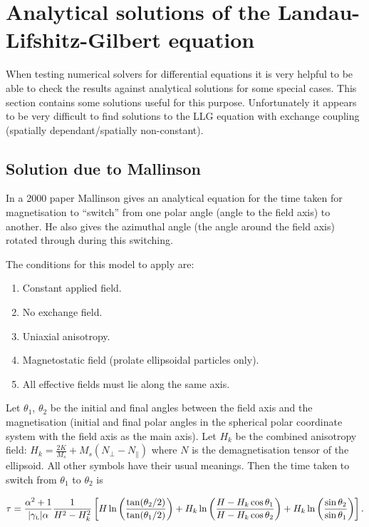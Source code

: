 \section{Analytical solutions of the Landau-Lifshitz-Gilbert equation}

When testing numerical solvers for differential equations it is very
helpful to be able to check the results against analytical solutions for
some special cases. This section contains some solutions useful for this
purpose.
Unfortunately it appears to be very difficult to find solutions to the LLG equation with exchange coupling (\ie spatially dependant/spatially non-constant).

\subsection{Solution due to Mallinson}

In a 2000 paper\cite{Mallinson2000} Mallinson gives an analytical equation for the time taken for magnetisation to ``switch'' from one polar angle (angle to the field axis) to another.
He also gives the azimuthal angle (the angle around the field axis) rotated through during this switching.

The conditions for this model to apply are:
\begin{enumerate}
\item Constant applied field.
\item No exchange field.
\item Uniaxial anisotropy.
\item Magnetostatic field (prolate ellipsoidal particles only).
\item All effective fields must lie along the same axis.
\end{enumerate}

Let $\theta_1$, $\theta_2$ be the initial and final angles between the field axis and the magnetisation (\ie initial and final polar angles in the spherical polar coordinate system with the field axis as the main axis). Let $H_k$ be the combined anisotropy field: $H_k = \frac{2 K}{M_s} + M_s(N_\perp - N_\parallel)$ where $N$ is the demagnetisation tensor of the ellipsoid. All other symbols have their usual meanings. Then the time taken to switch from $\theta_1$ to $\theta_2$ is

\begin{equation}
  \tau = \frac{\alpha^2 +1}{{\lvert \gamma_{\text{\tiny{L}}} \rvert} \alpha} \frac{1}{H^2 - H_k^2}
  \left[ H \ln \left( \frac{\tan(\theta_2/2)}{\tan(\theta_1/2)} \right)
       + H_k \ln \left( \frac{H - H_k \cos\theta_1}{H - H_k \cos\theta_2} \right)
       + H_k \ln \left( \frac{\sin\theta_2}{\sin\theta_1} \right)
    \right].
\end{equation}

